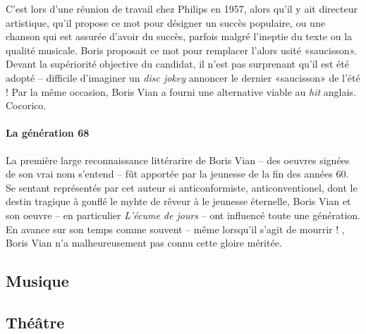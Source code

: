 \documentclass[twoside]{book}
\begin{document}
C'est lors d'une réunion de travail chez Philips en 1957, alors qu'il y ait
directeur artistique, qu'il propose ce mot pour désigner un succès populaire,
ou une chanson qui est assurée d'avoir du succès, parfois malgré l'ineptie du
texte ou la qualité musicale. Boris proposait ce mot pour remplacer l'alors
usité «saucisson». Devant la supériorité objective du candidat, il n'est pas
surprenant qu'il est été adopté -- difficile d'imaginer un \emph{disc jokey}
annoncer le dernier «saucisson» de l'été ! Par la même occasion, Boris Vian a
fourni une alternative viable au \emph{hit} anglais. Cocorico.

\paragraph{La génération 68}

La première large reconnaissance littérarire de Boris Vian -- des oeuvres signées
de son vrai nom s'entend -- fût apportée par la jeunesse de la fin des années 60.
Se sentant représentés par cet auteur si anticonformiste, anticonventionel, dont
le destin tragique à gonflé le myhte de rêveur à le jeunesse éternelle, Boris Vian
et son oeuvre -- en particulier \emph{L'écume de jours} -- ont influencé toute une
génération. En avance sur son temps comme souvent -- même lorsqu'il s'agit de
mourrir ! , Boris Vian n'a malheureusement pas connu cette gloire méritée.

\subsection{Musique}

\subsection{Théâtre}



\end{document}
